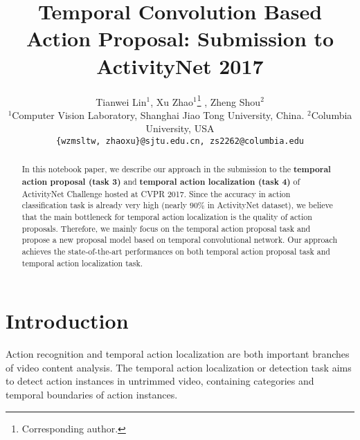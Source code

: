\documentclass[10pt,twocolumn,letterpaper]{article}
\begin{document}
\title{Temporal Convolution Based Action Proposal: Submission to ActivityNet 2017}

\author{Tianwei Lin$^1$, Xu Zhao$^1$\thanks{Corresponding author.} , Zheng Shou$^2$\\
$^1$Computer Vision Laboratory, Shanghai Jiao Tong University, China. $^2$Columbia University, USA\\
{\tt\small \{wzmsltw,~zhaoxu\}@sjtu.edu.cn, zs2262@columbia.edu}
}




\maketitle


\begin{abstract}

In this notebook paper, we describe our approach in the submission to  the {\bf temporal action proposal (task 3)} and {\bf temporal action localization  (task 4)} of ActivityNet Challenge hosted at CVPR 2017. 
Since the accuracy in action classification task is already very high (nearly $90\%$ in ActivityNet dataset), we believe that the main bottleneck for temporal action localization is the quality of action proposals. Therefore, we mainly focus on the temporal action proposal task and propose a new proposal model based on temporal convolutional network. 
Our approach achieves the state-of-the-art performances on both temporal action proposal task and temporal action localization task.

\end{abstract}


\section{Introduction}

Action recognition and temporal action localization are both important branches of video content analysis. The temporal action localization or detection task aims to detect action instances in untrimmed video, containing categories and temporal boundaries of action instances. 
\end{document}
